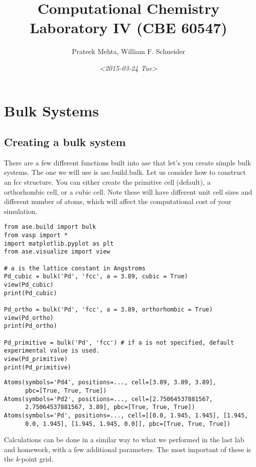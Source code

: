 \documentclass[11pt]{article}
\author{Prateek Mehta, William F. Schneider}
\date{\textit{<2015-03-24 Tue>}}
\title{Computational Chemistry Laboratory IV (CBE 60547)}
\begin{document}
\maketitle


\section{Bulk Systems}
\label{sec:org4bd13a9}

\subsection{Creating a bulk system}
\label{sec:orgc57fa20}

There are a few different functions built into ase that let's you create simple bulk systems. The one we will use is ase.build.bulk. Let us consider how to construct an fcc structure. You can either create the primitive cell (default), a orthorhombic cell, or a cubic cell. Note these will have different unit cell sizes and different number of atoms, which will affect the computational cost of your simulation. 

\begin{verbatim}
from ase.build import bulk
from vasp import *
import matplotlib.pyplot as plt
from ase.visualize import view

# a is the lattice constant in Angstroms
Pd_cubic = bulk('Pd', 'fcc', a = 3.89, cubic = True)
view(Pd_cubic)
print(Pd_cubic)

Pd_ortho = bulk('Pd', 'fcc', a = 3.89, orthorhombic = True)
view(Pd_ortho)
print(Pd_ortho)

Pd_primitive = bulk('Pd', 'fcc') # if a is not specified, default experimental value is used.
view(Pd_primitive)
print(Pd_primitive)
\end{verbatim}

\begin{verbatim}
Atoms(symbols='Pd4', positions=..., cell=[3.89, 3.89, 3.89],
      pbc=[True, True, True])
Atoms(symbols='Pd2', positions=..., cell=[2.75064537881567,
      2.75064537881567, 3.89], pbc=[True, True, True])
Atoms(symbols='Pd', positions=..., cell=[[0.0, 1.945, 1.945], [1.945,
      0.0, 1.945], [1.945, 1.945, 0.0]], pbc=[True, True, True])
\end{verbatim}

Calculations can be done in a similar way to what we performed in the last lab and homework, with a few additional parameters. The most important of these is the \emph{k}-point grid.
\end{document}
